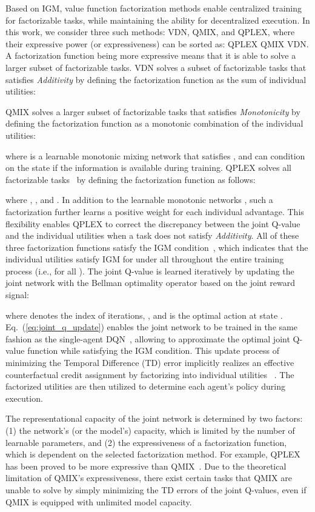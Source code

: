 \documentclass[twoside,11pt]{article}
\newcommand{\additivity}{\textit{Additivity}}
\newcommand{\monotonicity}{\textit{Monotonicity}}
\newcounter{example0}
\begin{document}
Based on IGM, value function factorization methods enable centralized training for factorizable tasks, while maintaining the ability for decentralized execution. In this work, we consider three such methods: VDN, QMIX, and QPLEX, where their expressive power (or expressiveness) can be sorted as: QPLEX  QMIX  VDN. A factorization function being more expressive means that it is able to solve a larger subset of factorizable tasks.
VDN solves a subset of factorizable tasks that satisfies \additivity{} by defining the factorization function as the sum of individual utilities:

QMIX solves a larger subset of factorizable tasks that satisfies \monotonicity{} by defining the factorization function as a monotonic combination of the individual utilities:

where  is a learnable monotonic mixing network that satisfies , and can condition on the state  if the information is available during training.
QPLEX solves all factorizable tasks~\citep{Wang2020QPLEX} by defining the factorization function as follows:

where , , and . In addition to the learnable monotonic networks , such a factorization further learns a positive weight  for each individual advantage. This flexibility enables QPLEX to correct the discrepancy between the joint Q-value and the individual utilities when a task does not satisfy \additivity{}.
All of these three factorization functions satisfy the IGM condition~\citep{Son2019QTRAN}, which indicates that the individual utilities  satisfy IGM for  under all  throughout the entire training process (i.e., for all ). The joint Q-value  is learned iteratively by updating the joint network with the Bellman optimality operator  based on the joint reward signal:

where  denotes the index of iterations, , and  is the optimal action at state . Eq.~(\ref{eq:joint_q_update}) enables the joint network to be trained in the same fashion as the single-agent DQN~\citep{Mnih2015DQN}, allowing  to approximate the optimal joint Q-value function  while satisfying the IGM condition. This update process of minimizing the Temporal Difference (TD) error implicitly realizes an effective counterfactual credit assignment by factorizing  into individual utilities ~\citep{wang2021towards}.
The factorized utilities are then utilized to determine each agent's policy during execution.

The representational capacity of the joint network is determined by two factors: (1) the network's (or the model's) capacity, which is limited by the number of learnable parameters, and (2) the expressiveness of a factorization function, which is dependent on the selected factorization method.
For example, QPLEX has been proved to be more expressive than QMIX~\citep{Wang2020QPLEX}. Due to the theoretical limitation of QMIX's expressiveness, there exist certain tasks that QMIX are unable to solve by simply minimizing the TD errors of the joint Q-values, even if QMIX is equipped with unlimited model capacity.
\end{document}
